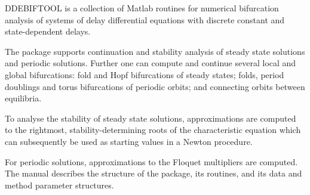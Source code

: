 DDEBIFTOOL is a collection of Matlab routines for
numerical bifurcation analysis of systems of delay differential
equations with discrete constant and state-dependent delays.

The package supports continuation and stability analysis of steady
state solutions and periodic solutions.  Further one can compute and
continue several local and global bifurcations: fold and Hopf
bifurcations of steady states; folds, period doublings and torus
bifurcations of periodic orbits; and
connecting orbits between equilibria.

To analyse the stability of steady state solutions, approximations are
computed to the rightmost, stability-determining roots of the
characteristic equation which can subsequently be used as starting
values in a Newton procedure.

For periodic solutions, approximations to the Floquet multipliers are
computed.  The manual describes the structure of the package, its routines, and
its data and method parameter structures.
